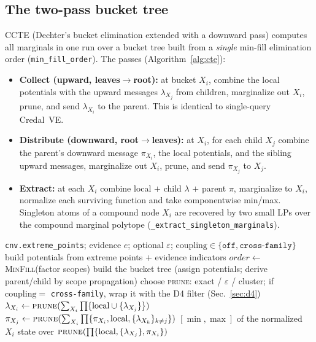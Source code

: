 \documentclass[11pt]{article}
\begin{document}
\subsection{The two-pass bucket tree}
CCTE (Dechter's bucket elimination extended with a downward pass) computes all marginals in
one run over a bucket tree built from a \emph{single} min-fill elimination order
(\texttt{min\_fill\_order}). The passes (Algorithm~\ref{alg:cte}):
\begin{itemize}
  \item \textbf{Collect (upward, leaves$\to$root):} at bucket $X_i$, combine the local
    potentials with the upward messages $\lambda_{X_j}$ from children, marginalize out $X_i$,
    prune, and send $\lambda_{X_i}$ to the parent. This is identical to single-query Credal~VE.
  \item \textbf{Distribute (downward, root$\to$leaves):} at $X_i$, for each child $X_j$
    combine the parent's downward message $\pi_{X_i}$, the local potentials, and the sibling
    upward messages, marginalize out $X_i$, prune, and send $\pi_{X_j}$ to $X_j$.
  \item \textbf{Extract:} at each $X_i$ combine local $+$ child $\lambda$ $+$ parent $\pi$,
    marginalize to $X_i$, normalize each surviving function and take componentwise min/max.
    Singleton atoms of a compound node $X_i$ are recovered by two small LPs over the compound
    marginal polytope (\texttt{\_extract\_singleton\_marginals}).
\end{itemize}

\begin{algorithm}[t]
\caption{Credal Cluster Tree Elimination (\texttt{CredalCTE.run})}\label{alg:cte}
\begin{algorithmic}[1]
\Require \texttt{cnv.extreme\_points}; evidence $e$; optional $\varepsilon$;
  $\mathrm{coupling}\in\{\texttt{off},\texttt{cross-family}\}$
\State build potentials from extreme points $+$ evidence indicators
\State $\mathit{order}\gets$ \textsc{MinFill}(factor scopes) 
\State build the bucket tree (assign potentials; derive parent/child by scope propagation)
\State choose \textsc{prune}: exact / $\varepsilon$ / cluster; if $\mathrm{coupling}=$
  \texttt{cross-family}, wrap it with the D4 filter (Sec.~\ref{sec:d4})
 $\lambda_{X_i}\gets\textsc{prune}(\sum_{X_i}\prod\{
  \text{local}\cup\{\lambda_{X_j}\}\})$ \EndFor
{} 
  $\pi_{X_j}\gets\textsc{prune}(\sum_{X_i}\prod\{\pi_{X_i},\text{local},\{\lambda_{X_k}\}_{k\ne
  j}\})$ \EndFor \EndFor
{} \Return $[\min,\max]$ of the normalized $X_i$ state over
  $\textsc{prune}(\prod\{\text{local},\{\lambda_{X_j}\},\pi_{X_i}\})$ \EndFor
\end{algorithmic}
\end{algorithm}
\end{document}
